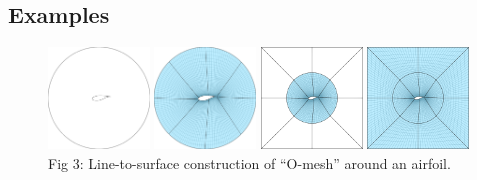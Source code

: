 \documentclass[landscape]{sintefposter}
\begin{document}
\begin{multicols}{3}
\section{Examples}

\begin{tcolorbox}[colback=white,colframe=sintefblue,title=Airfoil meshing]
  \begin{figure}[ht]
    \begin{center}
      \includegraphics[width=0.24\textwidth]{Figures/tfi-1}
      \includegraphics[width=0.24\textwidth]{Figures/tfi-2}
      \includegraphics[width=0.24\textwidth]{Figures/tfi-3}
      \includegraphics[width=0.24\textwidth]{Figures/tfi-4} \\
      \normalsize{
        Fig 3: Line-to-surface construction of ``O-mesh'' around an airfoil.
      }
    \end{center}
  \end{figure}
\end{tcolorbox}
\begin{tcolorbox}[colback=white,colframe=sintefblue,title=Wingtip meshing]
  \begin{figure}[ht]
    \begin{center}

\end{center}
\end{figure}
\end{tcolorbox}
\end{multicols}
\end{document}
